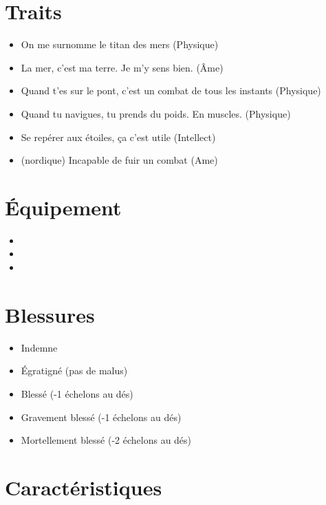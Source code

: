 \documentclass{Tamriel}
\begin{document}
\begin{multicols*}{2}
\raggedcolumns

        \section*{Traits}

        \begin{itemize}
        \item On me surnomme le titan des mers (Physique)
        \item La mer, c'est ma terre. Je m'y sens bien. (Âme)
        \item Quand t'es sur le pont, c'est un combat de tous les instants (Physique)
        \item Quand tu navigues, tu prends du poids. En muscles. (Physique) 
        \item Se repérer aux étoiles, ça c'est utile (Intellect)
        \item (nordique) Incapable de fuir un combat (Ame)
        \end{itemize}
        
        \section*{Équipement}

        \begin{itemize}
        \item 
        \item 
        \item 
        \end{itemize}
        
        \section*{Blessures}

	\begin{itemize}
	\item Indemne
	\item Égratigné (pas de malus)
	\item Blessé (-1 échelons au dés)
	\item Gravement blessé (-1 échelons au dés)
	\item Mortellement blessé (-2 échelons au dés)
        \end{itemize}
        
        \columnbreak
        
        \section*{Caractéristiques}


\end{multicols*}
\end{document}
